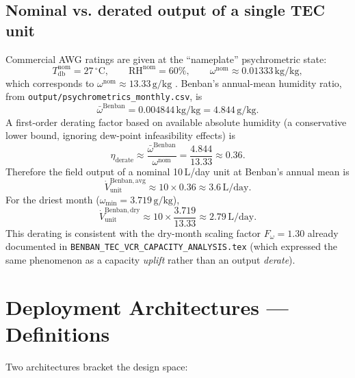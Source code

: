 \documentclass[11pt,a4paper]{article}
\newcommand{\SI}[2]{#1\,\ensuremath{\mathrm{#2}}}
\providecommand{\celsius}{^{\circ}\mathrm{C}}
\providecommand{\day}{day}
\providecommand{\liter}{L}
\providecommand{\kilogram}{kg}
\providecommand{\gram}{g}
\begin{document}
\subsection{Nominal vs. derated output of a single TEC unit}
Commercial AWG ratings are given at the ``nameplate'' psychrometric state:
\begin{equation}
T_{\mathrm{db}}^{\mathrm{nom}} = \SI{27}{\celsius},\qquad \mathrm{RH}^{\mathrm{nom}} = 60\%,
\qquad \omega^{\mathrm{nom}} \approx \SI{0.01333}{\kilogram/\kilogram},
\end{equation}
which corresponds to $\omega^{\mathrm{nom}}{\approx}\SI{13.33}{\gram/\kilogram}$ \citep{ashrae2021psychro}. Benban's annual-mean humidity ratio, from \texttt{output/psychrometrics\_monthly.csv}, is
\begin{equation}
\bar{\omega}^{\mathrm{Benban}} = \SI{0.004844}{\kilogram/\kilogram} = \SI{4.844}{\gram/\kilogram}.
\end{equation}
A first-order derating factor based on available absolute humidity (a conservative lower bound, ignoring dew-point infeasibility effects) is
\begin{equation}
\eta_{\mathrm{derate}} \approx \frac{\bar{\omega}^{\mathrm{Benban}}}{\omega^{\mathrm{nom}}} = \frac{4.844}{13.33} \approx 0.36.
\label{eq:derate}
\end{equation}
Therefore the field output of a nominal 10\,L/day unit at Benban's annual mean is
\begin{equation}
\dot{V}_{\mathrm{unit}}^{\mathrm{Benban,avg}} \approx 10\times 0.36 \approx \SI{3.6}{\liter/\day}.
\label{eq:unit_derated}
\end{equation}
For the driest month ($\omega_{\min}{=}\SI{3.719}{\gram/\kilogram}$),
\begin{equation}
\dot{V}_{\mathrm{unit}}^{\mathrm{Benban,dry}} \approx 10\times \frac{3.719}{13.33} \approx \SI{2.79}{\liter/\day}.
\end{equation}
This derating is consistent with the dry-month scaling factor $F_{\omega}{=}1.30$ already documented in \texttt{BENBAN\_TEC\_VCR\_CAPACITY\_ANALYSIS.tex} (which expressed the same phenomenon as a capacity \emph{uplift} rather than an output \emph{derate}).

\section{Deployment Architectures --- Definitions}
\label{sec:architectures}
Two architectures bracket the design space:
\end{document}
